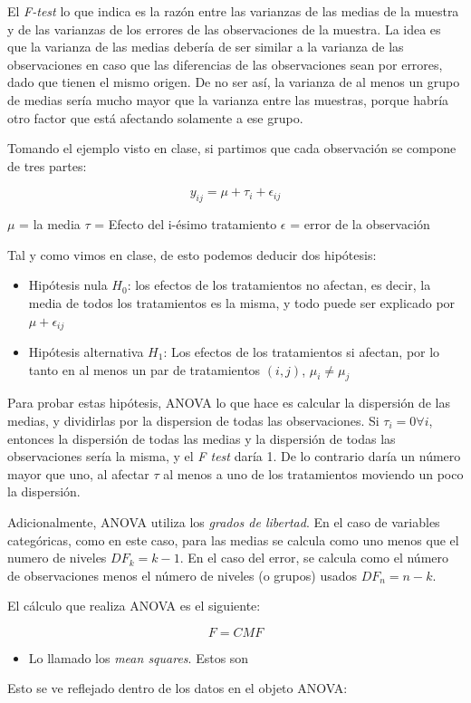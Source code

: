 \documentclass[]{article}
\providecommand{\tightlist}{%
  \setlength{\itemsep}{0pt}\setlength{\parskip}{0pt}}
\begin{document}
El \emph{F-test} lo que indica es la razón entre las varianzas de las
medias de la muestra y de las varianzas de los errores de las
observaciones de la muestra. La idea es que la varianza de las medias
debería de ser similar a la varianza de las observaciones en caso que
las diferencias de las observaciones sean por errores, dado que tienen
el mismo origen. De no ser así, la varianza de al menos un grupo de
medias sería mucho mayor que la varianza entre las muestras, porque
habría otro factor que está afectando solamente a ese grupo.

Tomando el ejemplo visto en clase, si partimos que cada observación se
compone de tres partes:

\[ y_{ij} = \mu + \tau_i + \epsilon_{ij} \]

\(\mu\) = la media \(\tau\) = Efecto del i-ésimo tratamiento
\(\epsilon\) = error de la observación

Tal y como vimos en clase, de esto podemos deducir dos hipótesis:

\begin{itemize}
\tightlist
\item
  Hipótesis nula \(H_0\): los efectos de los tratamientos no afectan, es
  decir, la media de todos los tratamientos es la misma, y todo puede
  ser explicado por \(\mu + \epsilon_{ij}\)
\item
  Hipótesis alternativa \(H_1\): Los efectos de los tratamientos si
  afectan, por lo tanto en al menos un par de tratamientos \((i,j)\),
  \(\mu_i \neq \mu_j\)
\end{itemize}

Para probar estas hipótesis, ANOVA lo que hace es calcular la dispersión
de las medias, y dividirlas por la dispersion de todas las
observaciones. Si \(\tau_i=0 \forall i\), entonces la dispersión de
todas las medias y la dispersión de todas las observaciones sería la
misma, y el \emph{F test} daría 1. De lo contrario daría un número mayor
que uno, al afectar \(\tau\) al menos a uno de los tratamientos moviendo
un poco la dispersión.

Adicionalmente, ANOVA utiliza los \emph{grados de libertad}. En el caso
de variables categóricas, como en este caso, para las medias se calcula
como uno menos que el numero de niveles \(DF_k=k-1\). En el caso del
error, se calcula como el número de observaciones menos el número de
niveles (o grupos) usados \(DF_n=n-k\).

El cálculo que realiza ANOVA es el siguiente:

\[
F=CMF
\]

\begin{itemize}
\tightlist
\item
  Lo llamado los \emph{mean squares}. Estos son
\end{itemize}

Esto se ve reflejado dentro de los datos en el objeto ANOVA:
\end{document}
